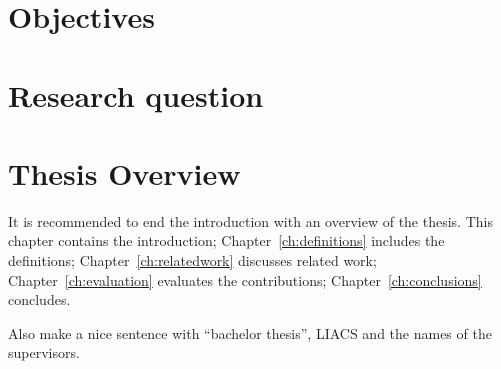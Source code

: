 \section{Objectives}


\section{Research question}

 
\section{Thesis Overview}
It is recommended to end the introduction with an overview of the thesis. This chapter contains the introduction; Chapter~\ref{ch:definitions} includes the definitions; Chapter~\ref{ch:relatedwork} discusses related work; Chapter~\ref{ch:evaluation} evaluates the contributions; Chapter~\ref{ch:conclusions} concludes.

Also make a nice sentence with ``bachelor thesis'', LIACS and the names of the supervisors.

